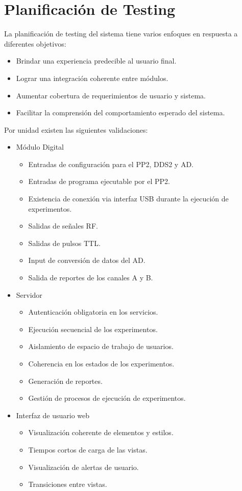 \section{Planificaci\'on de Testing}

La planificaci\'on de testing del sistema tiene varios enfoques en respuesta a diferentes objetivos:
\begin{itemize}
    \item Brindar una experiencia predecible al usuario final.
    \item Lograr una integraci\'on coherente entre m\'odulos.
    \item Aumentar cobertura de requerimientos de usuario y sistema.
    \item Facilitar la comprensi\'on del comportamiento esperado del sistema.
\end{itemize}
Por unidad existen las siguientes validaciones:
\begin{itemize}
    \item M\'odulo Digital
    \begin{itemize}
        \item Entradas de configuraci\'on para el PP2, DDS2 y AD.
        \item Entradas de programa ejecutable por el PP2.
        \item Existencia de conexi\'on via interfaz USB durante la ejecuci\'on de experimentos.
        \item Salidas de se\~nales RF.
        \item Salidas de pulsos TTL.
        \item Input de conversi\'on de datos del AD.
        \item Salida de reportes de los canales A y B.
    \end{itemize}
    \item Servidor
    \begin{itemize}
        \item Autenticaci\'on obligatoria en los servicios.
        \item Ejecuci\'on secuencial de los experimentos.
        \item Aislamiento de espacio de trabajo de usuarios.
        \item Coherencia en los estados de los experimentos.
        \item Generaci\'on de reportes.
        \item Gesti\'on de procesos de ejecuci\'on de experimentos.
    \end{itemize}
    \item Interfaz de usuario web
    \begin{itemize}
        \item Visualizaci\'on coherente de elementos y estilos.
        \item Tiempos cortos de carga de las vistas.
        \item Visualizaci\'on de alertas de usuario.
        \item Transiciones entre vistas.
    \end{itemize}
\end{itemize}

